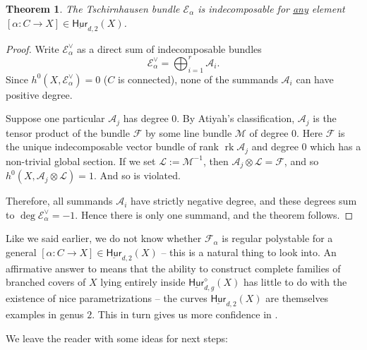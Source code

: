 \documentclass[reqno, 11pt]{amsart}
\newtheorem{theorem}{Theorem}[section]
\DeclareMathOperator{\rk}{rk}
\newcommand{\Hurfixed}[2]{\underline{\mathsf{Hur}}_{#1,#2}}
\newcommand{\Hurfixedstable}[2]{\underline{\mathsf{Hur}}_{#1,#2}^{\diamond}}
\begin{document}
\begin{theorem}
\label{theorem:genus2stableE}
    The Tschirnhausen bundle $\mathcal{E_{\alpha}}$ is indecomposable for \underline{any} element $[\alpha: C \to X] \in \Hurfixed{d}{2}(X)$.
\end{theorem}

\begin{proof}
    Write $\mathcal{E}_{\alpha}^{\vee}$ as a direct sum of indecomposable bundles \[\mathcal{E}_{\alpha}^{\vee} = \bigoplus_{i=1}^{r} \mathcal{A}_{i}.\]  Since $h^{0}(X,\mathcal{E}_{\alpha}^{\vee}) = 0$ ($C$ is connected), none of the summands $\mathcal{A}_{i}$ can have positive degree.  

    Suppose one particular $\mathcal{A}_{j}$ has degree $0$.  By Atiyah's classification, $\mathcal{A}_{j}$ is the tensor product of the bundle $\mathcal{F}$ by some line bundle $\mathcal{M}$ of degree $0$.  Here $\mathcal{F}$ is the unique indecomposable vector bundle of rank $\rk \mathcal{A}_{j}$ and degree $0$ which has a non-trivial global section.  If we set $\mathcal{L} := \mathcal{M}^{-1}$, then $\mathcal{A}_{j} \otimes \mathcal{L} = \mathcal{F}$, and so  $h^{0}(X, \mathcal{A}_{j} \otimes \mathcal{L}) = 1$.  And so  is violated.  

    Therefore, all summands $\mathcal{A}_{i}$ have strictly negative degree, and these degrees sum to $\deg \mathcal{E}_{\alpha}^{\vee} = -1$.  Hence there is only one summand, and the theorem follows.
\end{proof}

Like we said earlier, we do not know whether $\mathcal{F}_{\alpha}$ is regular polystable for a general $[\alpha: C \to X] \in \Hurfixed{d}{2}(X)$ -- this is a natural thing to look into.  An affirmative answer to  means that the ability to construct complete families of branched covers of $X$ lying entirely inside $\Hurfixedstable{d}{g}(X)$ has little to do with the existence of nice parametrizations -- the curves $\Hurfixed{d}{2}(X)$ are themselves examples in genus $2$.  This in turn gives us more confidence in .  


We leave the reader with some ideas for next steps:
\end{document}
